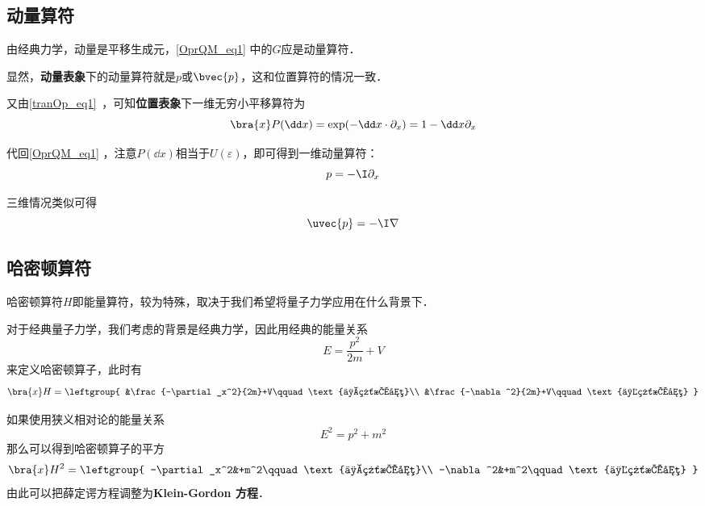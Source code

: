





\subsection{动量算符}


由经典力学，动量是平移生成元，\autoref{OprQM_eq1} 中的$G$应是动量算符．

显然，\textbf{动量表象}下的动量算符就是$p$或$\bvec{p}$，这和位置算符的情况一致．

又由\autoref{tranOp_eq1}~，可知\textbf{位置表象}下一维无穷小平移算符为
\begin{equation}
\bra{x}P(\dd x) = \exp(-\dd x \cdot \partial_x) = 1-\dd x\partial_x
\end{equation}

代回\autoref{OprQM_eq1} ，注意$P(\dd x)$相当于$U(\varepsilon)$，即可得到一维动量算符：
\begin{equation}
p  = -\I\partial_x
\end{equation}

三维情况类似可得
\begin{equation}
\uvec{p} = -\I\nabla
\end{equation}




\subsection{哈密顿算符}

哈密顿算符$H$即能量算符，较为特殊，取决于我们希望将量子力学应用在什么背景下．

对于经典量子力学，我们考虑的背景是经典力学，因此用经典的能量关系
\begin{equation}
E=\frac{p^2}{2m}+V
\end{equation}
来定义哈密顿算子，此时有
\begin{equation}
\bra{x}H = \leftgroup{
    &\frac{-\partial_x^2}{2m}+V\qquad\text{一维情况}\\
    &\frac{-\nabla^2}{2m}+V\qquad\text{三维情况}
}
\end{equation}

如果使用狭义相对论的能量关系
\begin{equation}
E^2 = p^2+m^2
\end{equation}
那么可以得到哈密顿算子的平方
\begin{equation}\label{OprQM_eq2}
\bra{x}H^2 = \leftgroup{
    -\partial_x^2&+m^2\qquad\text{一维情况}\\
    -\nabla^2&+m^2\qquad\text{三维情况}
}
\end{equation}
由此可以把薛定谔方程调整为\textbf{Klein-Gordon 方程}．

